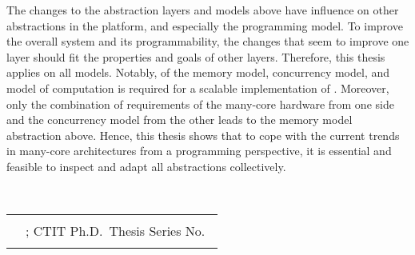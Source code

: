 The changes to the abstraction layers and models above have influence on other abstractions in the platform, and especially the programming model.
To improve the overall system and its programmability, the changes that seem to improve one layer should fit the properties and goals of other layers.
Therefore, this thesis applies \emph{\codesign} on all models.
Notably, \codesign of the memory model, concurrency model, and model of computation is required for a scalable implementation of \lcalc.
Moreover, only the combination of requirements of the many-core hardware from one side and the concurrency model from the other leads to the memory model abstraction above.
Hence, this thesis shows that to cope with the current trends in many-core architectures from a programming perspective, it is essential and feasible to inspect and adapt all abstractions collectively.

\ifabstractonly
	\vfill
	\textit{\small\thefulltitle}\\
	\begin{tabular}{@{}l>{}l}
	 & \thesisISBN \\
	 & \href{http://opc4.kb.nl/DB=1/SET=2/TTL=1/CMD?ACT=SRCHA&IKT=1007&SRT=YOP&TRM=\thesisISSN}{\thesisISSN}; %
		\acs*{CTIT} Ph.D.\ Thesis Series No.\ \thesisCTITnr \\
	  & \href{http://dx.doi.org/\thesisDOI}{\thesisDOI} \\
	\end{tabular}%
\fi

